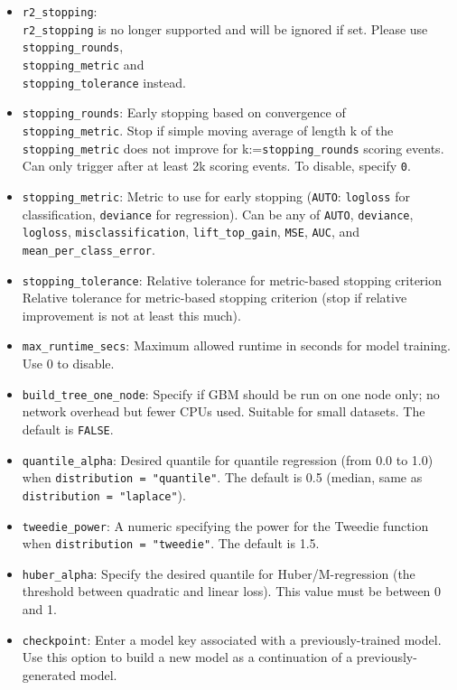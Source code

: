 \begin{itemize}
\item {\texttt{r2\_stopping}}: \\\texttt{r2\_stopping} is no longer supported and will be ignored if set. Please use \\\texttt{stopping\_rounds}, \\\texttt{stopping\_metric} and \\\texttt{stopping\_tolerance} instead.
\item \texttt{stopping\_rounds}: Early stopping based on convergence of \\\texttt{stopping\_metric}. Stop if simple moving average of length k of the \texttt{stopping\_metric} does not improve for k:=\texttt{stopping\_rounds} scoring events. Can only trigger after at least 2k scoring events. To disable, specify \texttt{0}.
\item \texttt{stopping\_metric}: Metric to use for early stopping (\texttt{AUTO}: \texttt{logloss} for classification, \texttt{deviance} for regression). Can be any of \texttt{AUTO}, \texttt{deviance}, \texttt{logloss}, \texttt{misclassification}, \texttt{lift\_top\_gain}, \texttt{MSE}, \texttt{AUC}, and \texttt{mean\_per\_class\_error}.
\item \texttt{stopping\_tolerance}: Relative tolerance for metric-based stopping criterion Relative tolerance for metric-based stopping criterion (stop if relative improvement is not at least this much).
\item \texttt{max\_runtime\_secs}: Maximum allowed runtime in seconds for model training. Use 0 to disable.
\item {\texttt{build\_tree\_one\_node}}: Specify if GBM should be run on one node only; no network overhead but fewer CPUs used. Suitable for small datasets.  The default is {\texttt{FALSE}}.
\item {\texttt{quantile\_alpha}}: Desired quantile for quantile regression (from 0.0 to 1.0) when \texttt{distribution = "quantile"}.  The default is 0.5 (median, same as \texttt{distribution = "laplace"}).
\item {\texttt{tweedie\_power}}: A numeric specifying the power for the Tweedie function when \texttt{distribution = "tweedie"}.  The default is 1.5.
\item \texttt{huber\_alpha}: Specify the desired quantile for Huber/M-regression (the threshold between quadratic and linear loss). This value must be between 0 and 1.
\item {\texttt{checkpoint}}: Enter a model key associated with a previously-trained model. Use this option to build a new model as a continuation of a previously-generated model.

\end{itemize}
